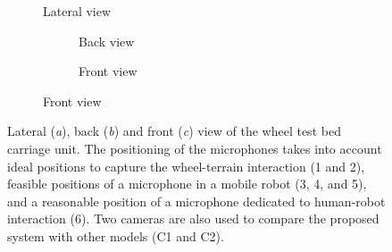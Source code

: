 \begin{figure}
    \begin{subfigure}{.57\linewidth}
        \centering
        
        \caption{Lateral view}
        \label{fig:wheeltestbed-setup-2-lateral}
    \end{subfigure}
    \hfill
    \begin{subfigure}{.40\linewidth}
        \begin{subfigure}{\linewidth}
            \centering
            
            \caption{Back view}
            \label{fig:wheeltestbed-setup-2-back}
        \end{subfigure}
        \bigskip
        
        \begin{subfigure}{\linewidth}
            \centering
            
            \caption{Front view}
            \label{fig:wheeltestbed-setup-2-front}
        \end{subfigure}
    \end{subfigure}
    \caption{Lateral (\emph{a}), back (\emph{b}) and front (\emph{c}) view of
    the wheel test bed carriage unit. The positioning of the microphones takes
    into account ideal positions to capture the wheel-terrain interaction (1
    and 2), feasible positions of a microphone in a mobile robot (3, 4, and 5),
    and a reasonable position of a microphone dedicated to human-robot
    interaction (6). Two cameras are also used to compare the proposed system
    with other models (C1 and C2).}
    \label{fig:wheeltestbed-setup-2}
\end{figure}



